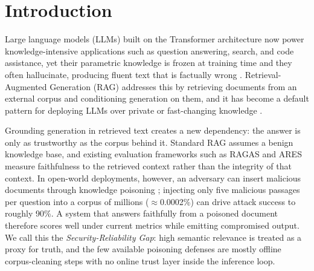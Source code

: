 \section{Introduction}

Large language models (LLMs) built on the Transformer architecture \cite{vaswani2017attention} now power knowledge-intensive applications such as question answering, search, and code assistance, yet their parametric knowledge is frozen at training time and they often hallucinate, producing fluent text that is factually wrong \cite{ji2023survey}. Retrieval-Augmented Generation (RAG) \cite{lewis2020rag} addresses this by retrieving documents from an external corpus and conditioning generation on them, and it has become a default pattern for deploying LLMs over private or fast-changing knowledge \cite{gao2024retrieval}.

Grounding generation in retrieved text creates a new dependency: the answer is only as trustworthy as the corpus behind it. Standard RAG assumes a benign knowledge base, and existing evaluation frameworks such as RAGAS \cite{es2024ragas} and ARES \cite{saadfalcon2024ares} measure faithfulness to the retrieved context rather than the integrity of that context. In open-world deployments, however, an adversary can insert malicious documents through knowledge poisoning \cite{zou2024poisoned}; injecting only five malicious passages per question into a corpus of millions ($\approx$0.0002\%) can drive attack success to roughly 90\%. A system that answers faithfully from a poisoned document therefore scores well under current metrics while emitting compromised output. We call this the \emph{Security-Reliability Gap}: high semantic relevance is treated as a proxy for truth, and the few available poisoning defenses are mostly offline corpus-cleaning steps with no online trust layer inside the inference loop.

